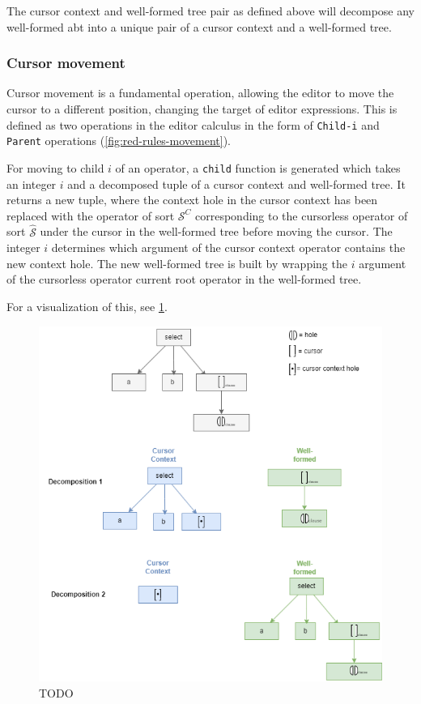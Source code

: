 The cursor context and well-formed tree pair as defined above will decompose
any well-formed abt into a unique pair of a cursor context and a well-formed tree.


\subsubsection{Cursor movement}
Cursor movement is a fundamental operation, allowing the editor to move the cursor
to a different position, changing the target of editor expressions. This is defined
as two operations in the editor calculus\cite{aalborg} in the form of
\texttt{Child-i} and \texttt{Parent} operations (\cref{fig:red-rules-movement}).

For moving to child $i$ of an operator, a \texttt{child} function is generated
which takes an integer $i$ and a decomposed tuple of a cursor context and well-formed
tree. It returns a new tuple, where the context hole in the cursor context has been 
replaced with the operator of sort $\mathcal{S}^C$ corresponding to the cursorless
operator of sort $\hat{\mathcal{S}}$ under the cursor in the well-formed tree before
moving the cursor. The integer $i$ determines which argument of the cursor context 
operator contains the new context hole. The new well-formed tree is built by 
wrapping the $i$ argument of the cursorless operator current root operator 
in the well-formed tree. 

For a visualization of this, see \cref{fig:cursor-movement-drawing}.

\begin{figure}[H]
  \includegraphics[width=\textwidth]{img/slq-decompose-ex.drawio.png}
  \caption{TODO}
  \label{fig:cursor-movement-drawing}
\end{figure}

